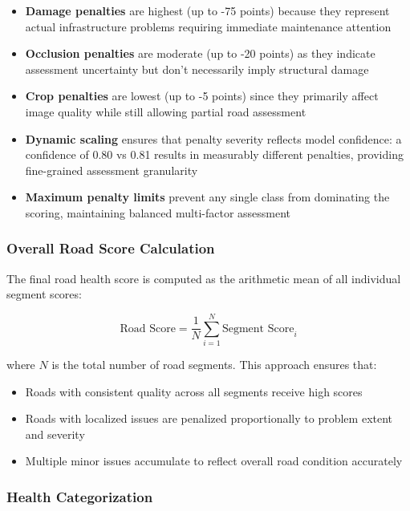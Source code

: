 \documentclass[12pt]{article}
\begin{document}
\begin{itemize}[itemsep=1pt,parsep=0pt,topsep=3pt]
\item \textbf{Damage penalties} are highest (up to -75 points) because they represent actual infrastructure problems requiring immediate maintenance attention
\item \textbf{Occlusion penalties} are moderate (up to -20 points) as they indicate assessment uncertainty but don't necessarily imply structural damage
\item \textbf{Crop penalties} are lowest (up to -5 points) since they primarily affect image quality while still allowing partial road assessment
\item \textbf{Dynamic scaling} ensures that penalty severity reflects model confidence: a confidence of 0.80 vs 0.81 results in measurably different penalties, providing fine-grained assessment granularity
\item \textbf{Maximum penalty limits} prevent any single class from dominating the scoring, maintaining balanced multi-factor assessment
\end{itemize}

\subsubsection{Overall Road Score Calculation}

The final road health score is computed as the arithmetic mean of all individual segment scores:

\begin{equation}
\text{Road Score} = \frac{1}{N} \sum_{i=1}^{N} \text{Segment Score}_i
\end{equation}

where $N$ is the total number of road segments. This approach ensures that:
\begin{itemize}[itemsep=1pt,parsep=0pt,topsep=2pt]
\item Roads with consistent quality across all segments receive high scores
\item Roads with localized issues are penalized proportionally to problem extent and severity
\item Multiple minor issues accumulate to reflect overall road condition accurately
\end{itemize}

\subsubsection{Health Categorization}
\end{document}
